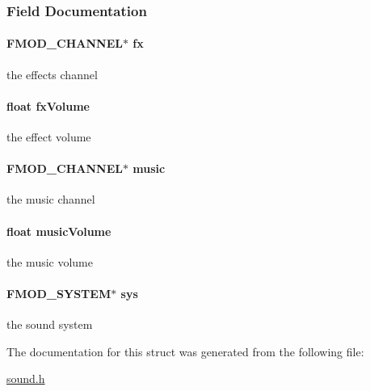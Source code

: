 \subsubsection{Field Documentation}
\hypertarget{struct_sound_a259d72174e26b5bb58146484cd54c1c8}{
\paragraph[{fx}]{\setlength{\rightskip}{0pt plus 5cm}F\-M\-O\-D\-\_\-\-C\-H\-A\-N\-N\-E\-L$\ast$ fx}}\label{struct_sound_a259d72174e26b5bb58146484cd54c1c8}
the effects channel \hypertarget{struct_sound_aedb4246a8bbae1c53f2f29572674b054}{
\paragraph[{fx\-Volume}]{\setlength{\rightskip}{0pt plus 5cm}float fx\-Volume}}\label{struct_sound_aedb4246a8bbae1c53f2f29572674b054}
the effect volume \hypertarget{struct_sound_acca26c408c6140c8cdc0d8f49d31ad4a}{
\paragraph[{music}]{\setlength{\rightskip}{0pt plus 5cm}F\-M\-O\-D\-\_\-\-C\-H\-A\-N\-N\-E\-L$\ast$ music}}\label{struct_sound_acca26c408c6140c8cdc0d8f49d31ad4a}
the music channel \hypertarget{struct_sound_a6f06b572245c72c79f052b7efb89dc3b}{
\paragraph[{music\-Volume}]{\setlength{\rightskip}{0pt plus 5cm}float music\-Volume}}\label{struct_sound_a6f06b572245c72c79f052b7efb89dc3b}
the music volume \hypertarget{struct_sound_ae043bb23ee313709e1c605dd6c06d317}{
\paragraph[{sys}]{\setlength{\rightskip}{0pt plus 5cm}F\-M\-O\-D\-\_\-\-S\-Y\-S\-T\-E\-M$\ast$ sys}}\label{struct_sound_ae043bb23ee313709e1c605dd6c06d317}
the sound system 

The documentation for this struct was generated from the following file\-:\begin{DoxyCompactItemize}
\item 
\hyperlink{sound_8h}{sound.\-h}\end{DoxyCompactItemize}
